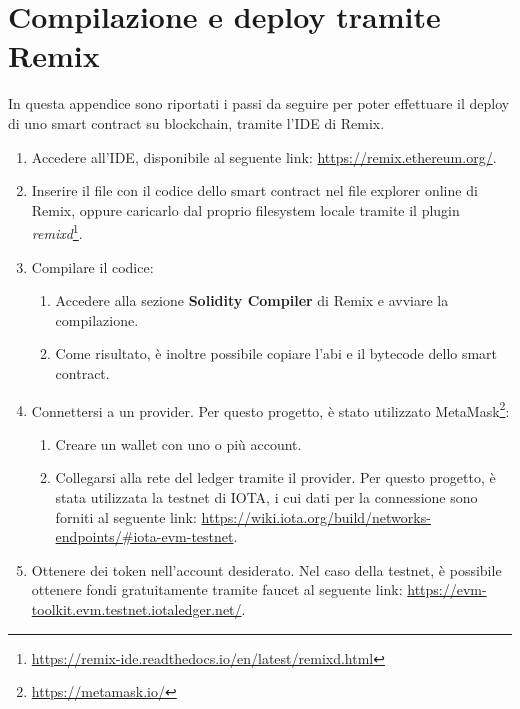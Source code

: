 \documentclass[12pt,a4paper,openright,twoside]{report}
\begin{document}
\chapter{Compilazione e deploy tramite Remix} %
\label{chap:deploy}

In questa appendice sono riportati i passi da seguire per poter effettuare il deploy di uno smart contract su blockchain, tramite l'IDE di Remix.
\begin{enumerate}
    \item Accedere all'IDE, disponibile al seguente link: \url{https://remix.ethereum.org/}.
    \item Inserire il file con il codice dello smart contract nel file explorer online di Remix, oppure caricarlo dal proprio filesystem locale tramite il plugin \textit{remixd}\footnote{\url{https://remix-ide.readthedocs.io/en/latest/remixd.html}}.
    \item Compilare il codice:
    \begin{enumerate}
        \item Accedere alla sezione \textbf{Solidity Compiler} di Remix e avviare la compilazione.
        \item Come risultato, è inoltre possibile copiare l'\acrshort{abi} e il bytecode dello smart contract.
    \end{enumerate}
    \pagebreak
    \item \label{enum:provider}Connettersi a un provider. Per questo progetto, è stato utilizzato MetaMask\footnote{\url{https://metamask.io/}}:
    \begin{enumerate}
        \item Creare un wallet con uno o più account.
        \item Collegarsi alla rete del ledger tramite il provider. Per questo progetto, è stata utilizzata la testnet di IOTA, i cui dati per la connessione sono forniti al seguente link: \url{https://wiki.iota.org/build/networks-endpoints/#iota-evm-testnet}.
    \end{enumerate}
    \item \label{enum:faucet}Ottenere dei token nell'account desiderato. Nel caso della testnet, è possibile ottenere fondi gratuitamente tramite faucet al seguente link: \url{https://evm-toolkit.evm.testnet.iotaledger.net/}.

\end{enumerate}
\end{document}
